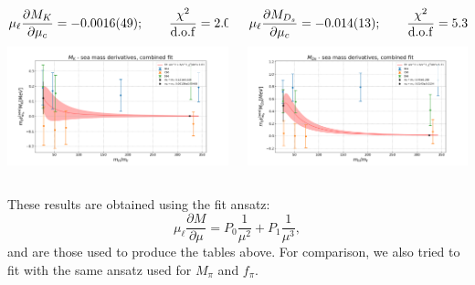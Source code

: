 \documentclass[xcolor={dvipsnames,table}]{beamer}
\begin{document}
\begin{frame}
  \begin{columns}
    \begin{column}{0.5\textwidth}
      {\small $$\mu_\ell \frac{\partial M_K}{\partial \mu_c} = -0.0016(49); \qquad\frac{\chi^2}{\rm d.o.f}= 2.0$$}
      \includegraphics[trim=0cm 0.5cm 0cm 1.3cm, clip,width=\textwidth]{plots/deco_fit_MK_der_mc.png}
    \end{column}
    \begin{column}{0.5\textwidth}
      {\small $$\mu_\ell \frac{\partial M_{D_s}}{\partial \mu_c} = -0.014(13); \qquad\frac{\chi^2}{\rm d.o.f}= 5.3$$}
      \includegraphics[trim=0cm 0.5cm 0cm 1.3cm, clip,width=\textwidth]{plots/deco_fit_MD_der_mc.png}
    \end{column}
  \end{columns}
  These results are obtained using the fit ansatz:
  \[
    \mu_\ell  \frac{\partial M }{\partial\mu} = P_0\frac{1}{\mu^2}+P_1\frac{1}{\mu^3},
  \]
  and are those used to produce the tables above. For comparison, we also tried to fit with the same ansatz used for $M_\pi$ and $f_\pi$.
\end{frame}
\end{document}

